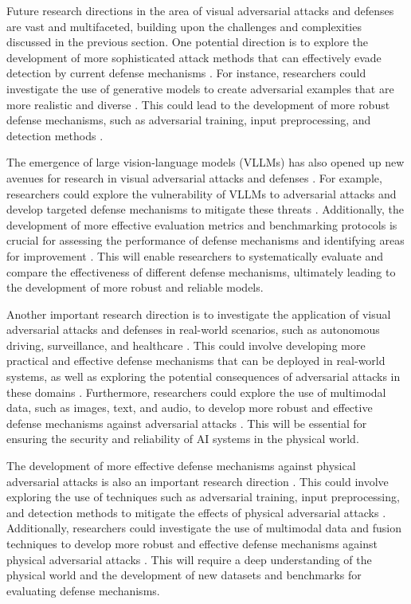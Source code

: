 \documentclass[11pt]{article}
\begin{document}
Future research directions in the area of visual adversarial attacks and defenses are vast and multifaceted, building upon the challenges and complexities discussed in the previous section. One potential direction is to explore the development of more sophisticated attack methods that can effectively evade detection by current defense mechanisms \cite{ref120}. For instance, researchers could investigate the use of generative models to create adversarial examples that are more realistic and diverse \cite{ref137}. This could lead to the development of more robust defense mechanisms, such as adversarial training, input preprocessing, and detection methods \cite{ref138}.

The emergence of large vision-language models (VLLMs) has also opened up new avenues for research in visual adversarial attacks and defenses \cite{ref139}. For example, researchers could explore the vulnerability of VLLMs to adversarial attacks and develop targeted defense mechanisms to mitigate these threats \cite{ref140}. Additionally, the development of more effective evaluation metrics and benchmarking protocols is crucial for assessing the performance of defense mechanisms and identifying areas for improvement \cite{ref141}. This will enable researchers to systematically evaluate and compare the effectiveness of different defense mechanisms, ultimately leading to the development of more robust and reliable models.

Another important research direction is to investigate the application of visual adversarial attacks and defenses in real-world scenarios, such as autonomous driving, surveillance, and healthcare \cite{ref34}. This could involve developing more practical and effective defense mechanisms that can be deployed in real-world systems, as well as exploring the potential consequences of adversarial attacks in these domains \cite{ref120}. Furthermore, researchers could explore the use of multimodal data, such as images, text, and audio, to develop more robust and effective defense mechanisms against adversarial attacks \cite{ref142}. This will be essential for ensuring the security and reliability of AI systems in the physical world.

The development of more effective defense mechanisms against physical adversarial attacks is also an important research direction \cite{ref143}. This could involve exploring the use of techniques such as adversarial training, input preprocessing, and detection methods to mitigate the effects of physical adversarial attacks \cite{ref61}. Additionally, researchers could investigate the use of multimodal data and fusion techniques to develop more robust and effective defense mechanisms against physical adversarial attacks \cite{ref144}. This will require a deep understanding of the physical world and the development of new datasets and benchmarks for evaluating defense mechanisms.
\end{document}
